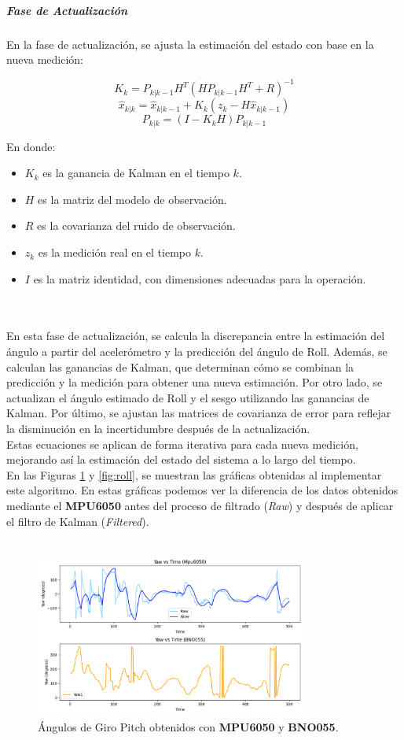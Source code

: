 \subparagraph{\textbf{\large Fase de Actualización}}

En la fase de actualización, se ajusta la estimación del estado con base en la nueva medición:

\[
K_k = P_{k|k-1} H^T (H P_{k|k-1} H^T + R)^{-1}
\]
\[
\hat{x}_{k|k} = \hat{x}_{k|k-1} + K_k (z_k - H \hat{x}_{k|k-1})
\]
\[
P_{k|k} = (I - K_k H) P_{k|k-1}
\]

En donde:
\begin{itemize}
    \item $K_k$ es la ganancia de Kalman en el tiempo $k$.
    \item $H$ es la matriz del modelo de observación.
    \item $R$ es la covarianza del ruido de observación.
    \item $z_k$ es la medición real en el tiempo $k$.
    \item $I$ es la matriz identidad, con dimensiones adecuadas para la operación.
\end{itemize}
\\ \\
En esta fase de actualización, se calcula la discrepancia entre la estimación del ángulo a partir del acelerómetro y la predicción del ángulo de Roll. Además, se calculan las ganancias de Kalman, que determinan cómo se combinan la predicción y la medición para obtener una nueva estimación. Por otro lado, se actualizan el ángulo estimado de Roll y el sesgo utilizando las ganancias de Kalman. Por último, se ajustan las matrices de covarianza de error para reflejar la disminución en la incertidumbre después de la actualización. \\

Estas ecuaciones se aplican de forma iterativa para cada nueva medición, mejorando así la estimación del estado del sistema a lo largo del tiempo. \\

En las Figuras  \ref{fig:pitch} y \ref{fig:roll}, se muestran las gráficas obtenidas al implementar este algoritmo. En estas gráficas podemos ver la diferencia de los datos obtenidos mediante el \textbf{MPU6050} antes del proceso de filtrado (\textit{Raw}) y después de aplicar el filtro de Kalman (\textit{Filtered}).
\\ \\
\begin{figure}[H]
    \centering
    \includegraphics[width=0.8\textwidth]{Imagenes/Metodologia/Angulos_Giro_pitch_Mpu6050_BNO055.png}
    \caption{Ángulos de Giro Pitch obtenidos con \textbf{MPU6050} y \textbf{BNO055}.}
    \label{fig:pitch}
\end{figure}

